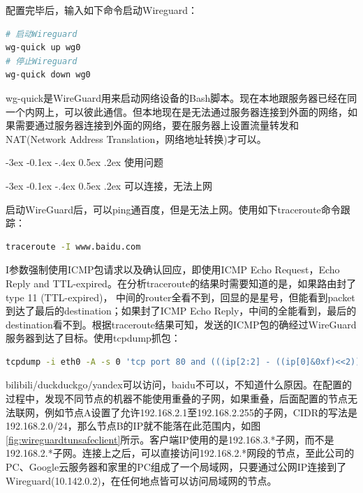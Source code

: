 \documentclass[8pt]{book}
\makeatletter
\numberwithin{dummy}{section}
\theoremstyle{ocrenumbox}
\theoremstyle{blacknumex}
\theoremstyle{blacknumbox}
\theoremstyle{ocrenum}
\renewcommand{\subsection}{\@startsection {subsection}{2}{\z@}
	{-3ex \@plus -0.1ex \@minus -.4ex}
	{0.5ex \@plus.2ex }
	{\normalfont\sffamily\bfseries}}
\makeatother
\begin{document}
配置完毕后，输入如下命令启动Wireguard：

\begin{lstlisting}[language=Bash]
# 启动Wireguard
wg-quick up wg0
# 停止Wireguard
wg-quick down wg0
\end{lstlisting}

wg-quick是WireGuard用来启动网络设备的Bash脚本。现在本地跟服务器已经在同一个内网上，可以彼此通信。但本地现在是无法通过服务器连接到外面的网络，如果需要通过服务器连接到外面的网络，要在服务器上设置流量转发和NAT(Network Address Translation，网络地址转换)才可以。

\subsection{使用问题}

\subsection{可以连接，无法上网}

启动WireGuard后，可以ping通百度，但是无法上网。使用如下traceroute命令跟踪：

\begin{lstlisting}[language=Bash]
traceroute -I www.baidu.com
\end{lstlisting}

I参数强制使用ICMP包请求以及确认回应，即使用ICMP Echo Request，Echo Reply and TTL-expired。在分析traceroute的结果时需要知道的是，如果路由封了type 11 (TTL-expired)， 中间的router全看不到，回显的是星号，但能看到packet到达了最后的destination；如果封了ICMP Echo Reply，中间的全能看到，最后的destination看不到。根据traceroute结果可知，发送的ICMP包的确经过WireGuard服务器到达了目标。使用tcpdump抓包：

\begin{lstlisting}[language=Bash]
tcpdump -i eth0 -A -s 0 'tcp port 80 and (((ip[2:2] - ((ip[0]&0xf)<<2)) - ((tcp[12]&0xf0)>>2)) != 0)'|grep "bilibili"
\end{lstlisting}

bilibili/duckduckgo/yandex可以访问，baidu不可以，不知道什么原因。在配置的过程中，发现不同节点的机器不能使用重叠的子网，如果重叠，后面配置的节点无法联网，例如节点A设置了允许192.168.2.1至192.168.2.255的子网，CIDR的写法是192.168.2.0/24，那么节点B的IP就不能落在此范围内，如图\ref{fig:wireguardtunsafeclient}所示。客户端IP使用的是192.168.3.*子网，而不是192.168.2.*子网。连接上之后，可以直接访问192.168.2.*网段的节点，至此公司的PC、Google云服务器和家里的PC组成了一个局域网，只要通过公网IP连接到了Wireguard(10.142.0.2)，在任何地点皆可以访问局域网的节点。
\end{document}
